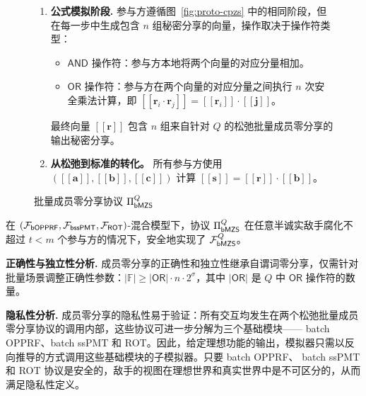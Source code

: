 \begin{figure}[!htb]
\begin{framed}
\begin{minipage}[c]{\textwidth}
\begin{trivlist}
\begin{enumerate}[itemsep=2pt,topsep=0pt,parsep=0pt,leftmargin=10pt]
$Q_i$ 的 $n$ 组秘密分享向量记作 $[\! [ \textbf{r}_i ] \!] = (\textbf{r}_{i,1},\cdots,\textbf{r}_{i,m})$。
\item \textbf{公式模拟阶段.} 参与方遵循图~\ref{fig:proto-cpzs} 中的相同阶段，但在每一步中生成包含 $n$ 组秘密分享的向量，操作取决于操作符类型：
    \begin{itemize}
        \item $\mathsf{AND}$ 操作符：参与方本地将两个向量的对应分量相加。 
        \item $\mathsf{OR}$ 操作符：参与方在两个向量的对应分量之间执行 $n$ 次安全乘法计算，即 $[\! [ \textbf{r}_i \cdot \textbf{r}_j ] \!] = [\! [ \textbf{r}_i ] \!] \cdot [\! [ \textbf{j} ] \!]$。
    \end{itemize}
最终向量 $[\! [ \textbf{r} ] \!]$ 包含 $n$ 组来自针对 $Q$ 的松弛批量成员零分享的输出秘密分享。
\item \textbf{从松弛到标准的转化。} 所有参与方使用 $([\! [ \textbf{a} ] \!], [\! [ \textbf{b} ] \!], [\! [ \textbf{c} ] \!])$ 计算 $[\! [ \textbf{s} ] \!] = [\! [ \textbf{r} ] \!] \cdot [\! [ \textbf{b} ] \!]$。
\end{enumerate}
\end{trivlist}
\end{minipage}
\end{framed}
\caption{批量成员零分享协议 $\Pi_\mathsf{bMZS}^Q$}\label{fig:proto-cmzs}
\end{figure}

\begin{theorem}\label{theorem:bmzs}
在 $(\mathcal{F}_\mathsf{bOPPRF}, \mathcal{F}_\mathsf{bssPMT}, \mathcal{F}_\mathsf{ROT})$-混合模型下，协议 $\Pi_\mathsf{bMZS}^Q$ 在任意半诚实敌手腐化不超过 $t < m$ 个参与方的情况下，安全地实现了 $\mathcal{F}_\mathsf{bMZS}^Q$。
\end{theorem}

\begin{trivlist}
\item \textbf{正确性与独立性分析.} 成员零分享的正确性和独立性继承自谓词零分享，仅需针对批量场景调整正确性参数：$\lvert \mathbb{F} \rvert \ge \lvert \mathsf{OR} \rvert \cdot n \cdot 2^\sigma$，其中 $\lvert \mathsf{OR} \rvert$ 是 $Q$ 中 $\mathsf{OR}$ 操作符的数量。

\item \textbf{隐私性分析.} 成员零分享的隐私性易于验证：所有交互均发生在两个松弛批量成员零分享协议的调用内部，这些协议可进一步分解为三个基础模块—— batch OPPRF、batch ssPMT 和 ROT。因此，给定理想功能的输出，模拟器只需以反向推导的方式调用这些基础模块的子模拟器。只要 batch OPPRF、 batch ssPMT 和 ROT 协议是安全的，敌手的视图在理想世界和真实世界中是不可区分的，从而满足隐私性定义。
\end{trivlist}

